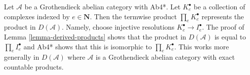 \begin{remark}
\label{remark-product-derived-Ab4*}
Let $\mathcal{A}$ be a Grothendieck abelian category with Ab4*.
Let $K_e^\bullet$ be a collection of complexes indexed by $e \in \mathbf{N}$.
Then the termwise product $\prod_e K_e^\bullet$ represents the product
in $D(\mathcal{A})$. Namely, choose injective resolutions
$K_e^\bullet \to I^\bullet_e$. The proof of
Lemma \ref{lemma-derived-products}
shows that the product in $D(\mathcal{A})$ is equal to
$\prod_e I_e^\bullet$ and Ab4* shows that this is isomorphic
to $\prod_e K_e^\bullet$.
This works more generally in $D(\mathcal{A})$ where $\mathcal{A}$ is a
Grothendieck abelian category with exact countable products.
\end{remark}
















